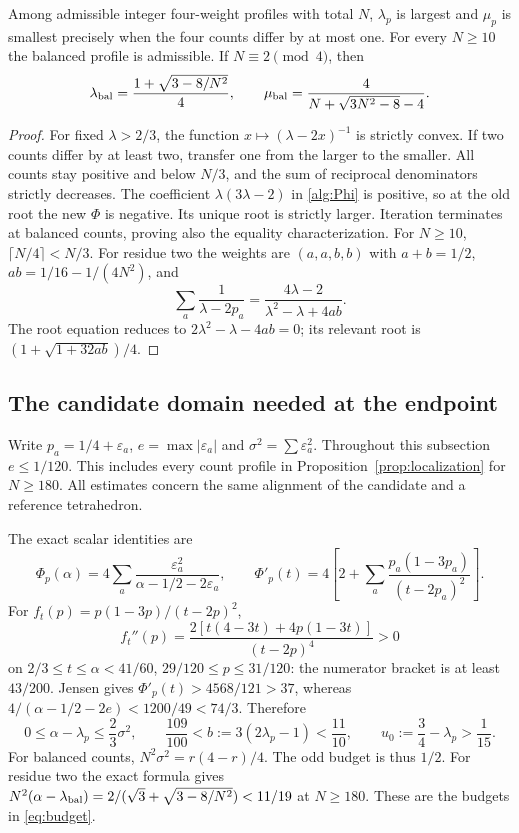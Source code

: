 \begin{proposition}\label{alg:balancing}
Among admissible integer four-weight profiles with total $N$,
$\lambda_p$ is largest and $\mu_p$ is smallest precisely when the four
counts differ by at most one. For every $N\geq10$ the balanced
profile is admissible. If $N\equiv2\pmod4$, then
\begin{equation}\label{alg:residue-two}
 \lambda_{\rm bal}=\frac{1+\sqrt{3-8/N^2}}4,\qquad
 \mu_{\rm bal}=\frac4{N+\sqrt{3N^2-8}-4}.
\end{equation}
\end{proposition}
\begin{proof}
For fixed $\lambda>2/3$, the function
$x\mapsto(\lambda-2x)^{-1}$ is strictly convex. If two counts differ
by at least two, transfer one from the larger to the smaller.
All counts stay positive and below $N/3$, and the sum of reciprocal
denominators strictly decreases. The coefficient $\lambda(3\lambda-2)$
in \eqref{alg:Phi} is positive, so at the old root the new $\Phi$ is
negative. Its unique root is strictly larger. Iteration terminates
at balanced counts, proving also the equality characterization.
For $N\geq10$, $\lceil N/4\rceil<N/3$.
For residue two the weights are $(a,a,b,b)$ with
$a+b=1/2$, $ab=1/16-1/(4N^2)$, and
\[
 \sum_a\frac1{\lambda-2p_a}
       =\frac{4\lambda-2}{\lambda^2-\lambda+4ab}.
\]
The root equation reduces to $2\lambda^2-\lambda-4ab=0$;
its relevant root is $(1+\sqrt{1+32ab})/4$.
\end{proof}


\subsection{The candidate domain needed at the endpoint}\label{app:candidate:domain}
Write $p_a=1/4+\varepsilon_a$, $e=\max|\varepsilon_a|$ and
$\sigma^2=\sum\varepsilon_a^2$. Throughout this subsection $e\le1/120$.
This includes every count profile in Proposition~\ref{prop:localization}
for $N\ge180$. All estimates concern the same alignment of the candidate
and a reference tetrahedron.

The exact scalar identities are
\[
 \Phi_p(\alpha)=4\sum_a\frac{\varepsilon_a^2}{\alpha-1/2-2\varepsilon_a},
 \qquad \Phi'_p(t)=4\left[2+\sum_a\frac{p_a(1-3p_a)}{(t-2p_a)^2}\right].
\]
For $f_t(p)=p(1-3p)/(t-2p)^2$,
\[
 f_t''(p)=\frac{2[t(4-3t)+4p(1-3t)]}{(t-2p)^4}>0
\]
on $2/3\le t\le\alpha<41/60$, $29/120\le p\le31/120$:
the numerator bracket is at least $43/200$. Jensen gives
$\Phi'_p(t)>4568/121>37$, whereas
$4/(\alpha-1/2-2e)<1200/49<74/3$. Therefore
\begin{equation}\label{app:candidate:deficit}
 0\le\alpha-\lambda_p\le\frac23\sigma^2,\qquad
 \frac{109}{100}<b:=3(2\lambda_p-1)<\frac{11}{10},\qquad
 u_0:=\frac34-\lambda_p>\frac1{15}.
\end{equation}
For balanced counts, $N^2\sigma^2=r(4-r)/4$. The odd budget is thus
$1/2$. For residue two the exact formula gives
$N^2(\alpha-\lambda_{\rm bal})=2/(\sqrt3+\sqrt{3-8/N^2})<11/19$
at $N\ge180$. These are the budgets in \eqref{eq:budget}.

